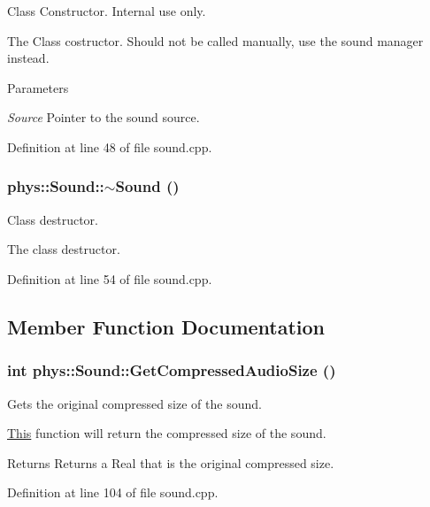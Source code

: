 Class Constructor. Internal use only. 

The Class costructor. Should not be called manually, use the sound manager instead. 
\begin{DoxyParams}{Parameters}
\item[{\em Source}]Pointer to the sound source. \end{DoxyParams}


Definition at line 48 of file sound.cpp.

\hypertarget{classphys_1_1Sound_ad49df56479e003d0990a5dcb1c506d39}{
\subsubsection[{$\sim$Sound}]{\setlength{\rightskip}{0pt plus 5cm}phys::Sound::$\sim$Sound ()}}
\label{dc/d2f/classphys_1_1Sound_ad49df56479e003d0990a5dcb1c506d39}


Class destructor. 

The class destructor. 

Definition at line 54 of file sound.cpp.



\subsection{Member Function Documentation}
\hypertarget{classphys_1_1Sound_af568fd5293ecab6185f509e52209a0a2}{
\subsubsection[{GetCompressedAudioSize}]{\setlength{\rightskip}{0pt plus 5cm}int phys::Sound::GetCompressedAudioSize ()}}
\label{dc/d2f/classphys_1_1Sound_af568fd5293ecab6185f509e52209a0a2}


Gets the original compressed size of the sound. 

\hyperlink{structThis}{This} function will return the compressed size of the sound. \begin{DoxyReturn}{Returns}
Returns a Real that is the original compressed size. 
\end{DoxyReturn}


Definition at line 104 of file sound.cpp.

